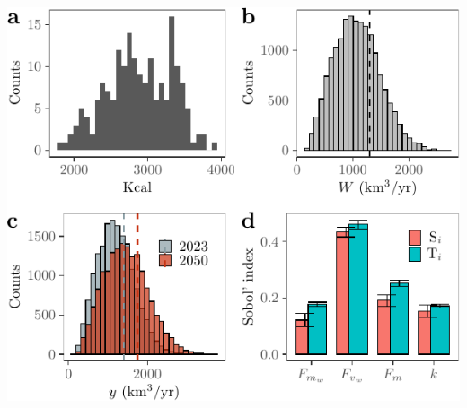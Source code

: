 \documentclass[
  11pt,
]{article}
\begin{document}
\includegraphics{code_fallacies_water_crisis_files/figure-latex/merge_figures-1.pdf}
\end{document}
